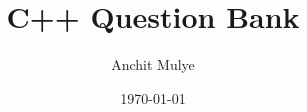 \newpage
\thispagestyle{empty} %
\title{C++ Question Bank}
\author{Anchit Mulye}
\date{\today}
\maketitle

\tableofcontents
\newpage
